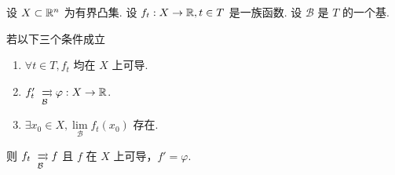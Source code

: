 \begin{theorem}\label{limd}
    设 $X\subset\mathbb{R}^n$ 为有界凸集. 设 $f_t:X\to\mathbb{R},t\in T$ 是一族函数. 设 $\mathcal{B}$ 是 $T$ 的一个基.

    若以下三个条件成立

    \begin{enumerate}
        \item $\forall t\in T,f_t$ 均在 $X$ 上可导.
        
        \item $f_t'\xrightrightarrows[\mathcal{B}]{}\varphi:X\to\RR$.
        
        \item $\exists x_0\in X,\lim\limits_{\mathcal{B}}f_t(x_0)$ 存在.
    \end{enumerate}

    则 $f_t\xrightrightarrows[\mathcal{B}]{}{f}$ 且 $f$ 在 $X$ 上可导，$f'=\varphi$.
\end{theorem}
